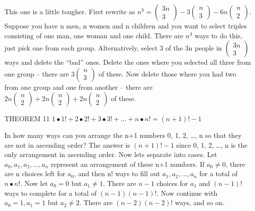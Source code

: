 \documentclass{article}
\begin{document}
This one is a little tougher.  First rewrite as 
$n^3=\left(\begin{matrix}3n\\3\end{matrix}\right)-3\left(\begin{matrix}n\\3\end{matrix}\right)-6n\left(\begin{matrix}n\\2\end{matrix}\right)$.
 Suppose you have  n  men,  n  women and  n  children and you want to select triples consisting of one man, one woman
and one child.  There are  $n^3$ ways to do this, just pick one from each group.  Alternatively, select 3 of the 3n
people in   $\left(\begin{matrix}3n\\3\end{matrix}\right)$ ways and delete the “bad” ones.  Delete the ones where you
selected all three from one group – there are  $3\left(\begin{matrix}n\\3\end{matrix}\right)$ of these.  Now delete
those where you had two from one group and one from another – there are 
$2n\left(\begin{matrix}n\\2\end{matrix}\right)+2n\left(\begin{matrix}n\\2\end{matrix}\right)+2n\left(\begin{matrix}n\\2\end{matrix}\right)$
of these.

THEOREM 11   $1{\bullet}1!+2{\bullet}2!+3{\bullet}3!+{\dots}+n{\bullet}n!=\left(n+1\right)!-1$

In how many ways can you arrange the n+1 numbers 0, 1, 2, …, n so that they are not in ascending order?  The answer is 
$\left(n+1\right)!-1$ since 0, 1, 2, …, n is the only arrangement in ascending order.  Now lets separate into cases. 
Let  $a_0,a_1,a_2,{\dots},a_n$ represent an arrangement of these n+1 numbers.  If  $a_0{\neq}0$, there are  n  choices
left for  $a_0$, and then n! ways to fill out  $a_1,a_2,{\dots},a_n$ for a total of  $n{\bullet}n!$.  Now let  $a_0=0$
but  $a_1{\neq}1$.  There are  $n-1$ choices for  $a_1$ and  $\left(n-1\right)!$ ways to complete for a total of 
$\left(n-1\right)\left(n-1\right)!$.  Now continue with  $a_0=1,a_1=1$  but  $a_2{\neq}2$.  There are 
$\left(n-2\right)\left(n-2\right)!$ ways, and so on.
\end{document}
